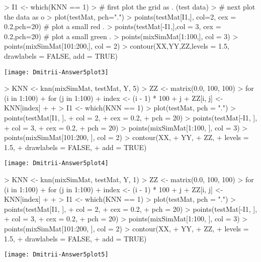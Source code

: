 \documentclass{article}
\begin{document}
\begin{Schunk}
\begin{Sinput}
> I1 <- which(KNN == 1)
> # first plot the grid as .  (test data)
> # next plot the data as o
> plot(testMat, pch=".")
> points(testMat[I1,], col=2, cex = 0.2,pch=20)   # plot a small red .
> points(testMat[-I1,],col = 3, cex = 0.2,pch=20) # plot a small green .
> points(mixSimMat[1:100,], col = 3)
> points(mixSimMat[101:200,], col = 2)
> contour(XX,YY,ZZ,levels = 1.5, drawlabels = FALSE, add = TRUE)
\end{Sinput}
\end{Schunk}
\texttt{[image: Dmitrii-Answer5plot3]}
\begin{Schunk}
\begin{Sinput}
> KNN <- knn(mixSimMat, testMat, Y, 5)
> ZZ <- matrix(0.0, 100, 100)
> for (i in 1:100) {
+   for (j in 1:100) {
+     index <- (i - 1) * 100 + j
+     ZZ[i, j] <- KNN[index]
+   }
+ }
> I1 <- which(KNN == 1)
> plot(testMat, pch = ".")
> points(testMat[I1, ],
+        col = 2,
+        cex = 0.2,
+        pch = 20)
> points(testMat[-I1, ],
+        col = 3,
+        cex = 0.2,
+        pch = 20)
> points(mixSimMat[1:100, ], col = 3)
> points(mixSimMat[101:200, ], col = 2)
> contour(XX,
+         YY,
+         ZZ,
+         levels = 1.5,
+         drawlabels = FALSE,
+         add = TRUE)
\end{Sinput}
\end{Schunk}
\texttt{[image: Dmitrii-Answer5plot4]}
\begin{Schunk}
\begin{Sinput}
> KNN <- knn(mixSimMat, testMat, Y, 1)
> ZZ <- matrix(0.0, 100, 100)
> for (i in 1:100) {
+   for (j in 1:100) {
+     index <- (i - 1) * 100 + j
+     ZZ[i, j] <- KNN[index]
+   }
+ }
> I1 <- which(KNN == 1)
> plot(testMat, pch = ".")
> points(testMat[I1, ],
+        col = 2,
+        cex = 0.2,
+        pch = 20)
> points(testMat[-I1, ],
+        col = 3,
+        cex = 0.2,
+        pch = 20)
> points(mixSimMat[1:100, ], col = 3)
> points(mixSimMat[101:200, ], col = 2)
> contour(XX,
+         YY,
+         ZZ,
+         levels = 1.5,
+         drawlabels = FALSE,
+         add = TRUE)
\end{Sinput}
\end{Schunk}
\texttt{[image: Dmitrii-Answer5plot5]}
\end{document}
